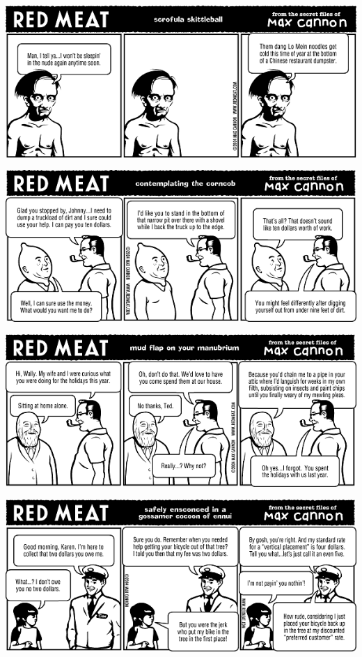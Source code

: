 \documentclass[a4paper,twoside,11pt]{article}
\begin{document}
\includegraphics[width=\textwidth]{redmeat_2004-10-26.png}



\includegraphics[width=\textwidth]{redmeat_2004-11-02.png}



\includegraphics[width=\textwidth]{redmeat_2004-11-09.png}



\includegraphics[width=\textwidth]{redmeat_2004-11-16.png}
\end{document}
